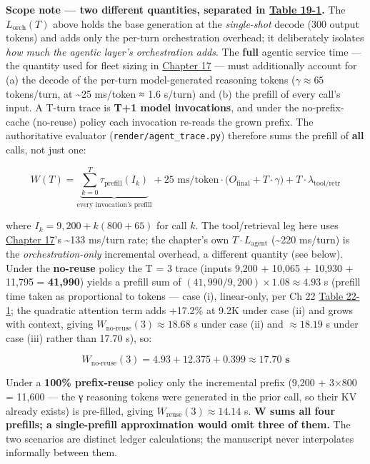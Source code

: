 \textbf{Scope note --- two different quantities, separated in \hyperref[tab:19.1]{Table 19-1}.} The \(L_\text{orch}(T)\) above holds the base generation at the
\emph{single-shot} decode (300 output tokens) and adds only the per-turn
orchestration overhead; it deliberately isolates \emph{how much the
agentic layer's orchestration adds}. The \textbf{full} agentic service
time --- the quantity used for fleet sizing in \hyperref[chap:17]{Chapter 17} --- must
additionally account for (a) the decode of the per-turn model-generated
reasoning tokens (\(\gamma \approx 65\) tokens/turn, at
\textasciitilde25 ms/token ≈ 1.6 s/turn) and (b) the prefill of every
call's input. A T-turn trace is \textbf{T+1 model invocations}, and
under the no-prefix-cache (no-reuse) policy each invocation re-reads the
grown prefix. The authoritative evaluator
(\texttt{render/agent\_trace.py}) therefore sums the prefill of
\textbf{all} calls, not just one:

\[
W(T) = \underbrace{\sum_{k=0}^{T} \tau_\text{prefill}\!\left(I_k\right)}_{\text{every invocation's prefill}} + 25\text{ ms/token}\cdot\big(O_\text{final} + T\cdot\gamma\big) + T\cdot\lambda_\text{tool/retr}
\]

where \(I_k = 9{,}200 + k(800+65)\) for call \(k\). The tool/retrieval
leg here uses \hyperref[chap:17]{Chapter 17}'s \textasciitilde133 ms/turn rate; the
chapter's own \(T\cdot L_\text{agent}\) (\textasciitilde220 ms/turn) is
the \emph{orchestration-only} incremental overhead, a different quantity
(see below). Under the \textbf{no-reuse} policy the T = 3 trace (inputs
9,200 + 10,065 + 10,930 + 11,795 = \textbf{41,990}) yields a prefill sum
of \((41{,}990 / 9{,}200)\times 1.08 \approx 4.93\) s (prefill time
taken as proportional to tokens --- case (i), linear-only, per Ch 22
\hyperref[tab:22.1]{Table 22-1}; the quadratic attention term adds +17.2\% at 9.2K under case
(ii) and grows with context, giving
\(W_\text{no-reuse}(3) \approx 18.68\) s under case (ii) and
\(\approx 18.19\) s under case (iii) rather than 17.70 s), so:

\[
W_\text{no-reuse}(3) = 4.93 + 12.375 + 0.399 \approx \mathbf{17.70\text{ s}}
\]

Under a \textbf{100\% prefix-reuse} policy only the incremental prefix
(9,200 + 3×800 = 11,600 --- the γ reasoning tokens were generated in the
prior call, so their KV already exists) is pre-filled, giving
\(W_\text{reuse}(3) \approx 14.14\) s. \textbf{W sums all four prefills;
a single-prefill approximation would omit three of them.} The two
scenarios are distinct ledger calculations; the manuscript never
interpolates informally between them.

